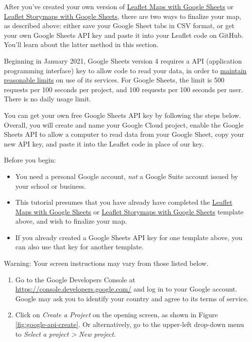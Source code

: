 \documentclass[
  english,
]{book}
\providecommand{\tightlist}{%
  \setlength{\itemsep}{0pt}\setlength{\parskip}{0pt}}
\begin{document}
After you've created your own version of \href{leaflet-maps-with-google-sheets.html}{Leaflet Maps with Google Sheets} or \href{leaflet-storymaps-with-google-sheets.html}{Leaflet Storymaps with Google Sheets}, there are two ways to finalize your map, as described above: either save your Google Sheet tabs in CSV format, or get your own Google Sheets API key and paste it into your Leaflet code on GitHub. You'll learn about the latter method in this section.

Beginning in January 2021, Google Sheets version 4 requires a API (application programming interface) key to allow code to read your data, in order to \href{https://developers.google.com/sheets/api/limits}{maintain reasonable limits} on use of its services. For Google Sheets, the limit is 500 requests per 100 seconds per project, and 100 requests per 100 seconds per user. There is no daily usage limit.

You can get your own free Google Sheets API key by following the steps below. Overall, you will create and name your Google Cloud project, enable the Google Sheets API to allow a computer to read data from your Google Sheet, copy your new API key, and paste it into the Leaflet code in place of our key.

Before you begin:

\begin{itemize}
\tightlist
\item
  You need a personal Google account, \emph{not} a Google Suite account issued by your school or business.
\item
  This tutorial presumes that you have already have completed the \href{leaflet-maps-with-google-sheets.html}{Leaflet Maps with Google Sheets} or \href{leaflet-storymaps-with-google-sheets.html}{Leaflet Storymaps with Google Sheets} template above, and wish to finalize your map.
\item
  If you already created a Google Sheets API key for one template above, you can also use that key for another template.
\end{itemize}

Warning: Your screen instructions may vary from those listed below.

\begin{enumerate}
\def\labelenumi{\arabic{enumi}.}
\item
  Go to the Google Developers Console at \url{https://console.developers.google.com/} and log in to your Google account. Google may ask you to identify your country and agree to its terms of service.
\item
  Click on \emph{Create a Project} on the opening screen, as shown in Figure \ref{fig:google-api-create}. Or alternatively, go to the upper-left drop-down menu to \emph{Select a project \textgreater{} New project}.
\end{enumerate}
\end{document}

